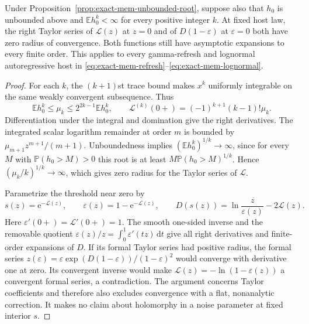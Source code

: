 \begin{proposition}
\label{prop:exact-mem-zero-radius}
Under Proposition~\ref{prop:exact-mem-unbounded-root}, suppose also
that $h_0$ is unbounded above and $\mathbb E h_0^k<\infty$ for every
positive integer $k$. At fixed host law, the right Taylor series of
$\mathcal L(z)$ at $z=0$ and of $D(1-\varepsilon)$ at
$\varepsilon=0$ both have zero radius of convergence. Both functions
still have asymptotic expansions to every finite order. This applies
to every gamma-refresh and lognormal autoregressive host in
\eqref{eq:exact-mem-refresh}--\eqref{eq:exact-mem-lognormal}.
\end{proposition}

\begin{proof}
For each $k$, the $(k+1)$st trace bound makes $x^k$ uniformly
integrable on the same weakly convergent subsequence. Thus
\begin{equation}
 \mathbb E h_0^k\leq\mu_k\leq2^{2k-1}\mathbb E h_0^k,\qquad
 \mathcal L^{(k)}(0+)=(-1)^{k+1}(k-1)!\mu_k.
 \label{eq:exact-mem-zero-radius-moments}
\end{equation}
Differentiation under the integral and domination give the right
derivatives. The integrated scalar logarithm remainder at order $m$
is bounded by $\mu_{m+1}z^{m+1}/(m+1)$.
Unboundedness implies $(\mathbb E h_0^k)^{1/k}\to\infty$, since
for every $M$ with $\mathbb P(h_0>M)>0$ this root is at least
$M\mathbb P(h_0>M)^{1/k}$. Hence $(\mu_k/k)^{1/k}\to\infty$,
which gives zero radius for the Taylor series of $\mathcal L$.

Parametrize the threshold near zero by
\begin{equation}
 s(z)=\mathrm e^{-\mathcal L(z)},\qquad
 \varepsilon(z)=1-\mathrm e^{-\mathcal L(z)},\qquad
 D(s(z))=\ln\frac{z}{\varepsilon(z)}-2\mathcal L(z).
 \label{eq:exact-mem-series-inversion}
\end{equation}
Here $\varepsilon'(0+)=\mathcal L'(0+)=1$.
The smooth one-sided inverse and the removable quotient
$\varepsilon(z)/z=\int_0^1\varepsilon'(tz)\,\mathrm d t$
give all right derivatives and finite-order expansions of $D$.
If its formal Taylor series had positive radius, the formal series
$z(\varepsilon)=\varepsilon\exp(D(1-\varepsilon))/(1-\varepsilon)^2$
would converge with derivative one at zero. Its convergent inverse
would make $\mathcal L(z)=-\ln(1-\varepsilon(z))$ a convergent
formal series, a contradiction. The argument concerns Taylor
coefficients and therefore also excludes convergence with a flat,
nonanalytic correction. It makes no claim about holomorphy in a
noise parameter at fixed interior $s$.
\end{proof}

